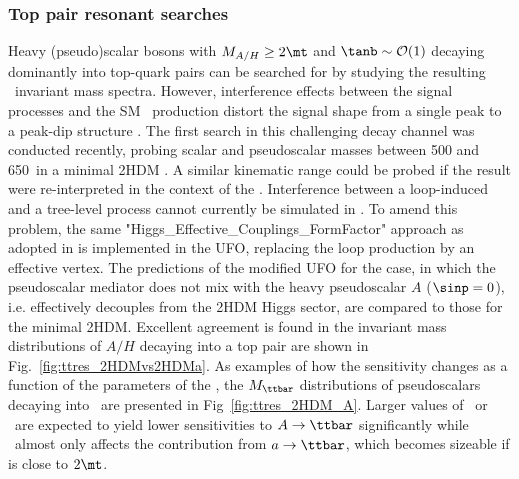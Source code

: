 \subsubsection{Top pair resonant searches}
Heavy (pseudo)scalar bosons with $M_{A/H}\ge2\mt$ and $\tanb \sim \mathcal{O}(1)$ decaying dominantly into top-quark pairs can be
searched for by studying the resulting \ttbar\ invariant mass
spectra. However, interference effects between the signal processes
and the SM \ttbar\ production distort the signal shape from a single
peak to a peak-dip structure \cite{Carena:2016npr}. The first search in this challenging decay channel was conducted recently, probing scalar and pseudoscalar masses between 500 and 650\GeV\ in a minimal 2HDM \cite{Aaboud:2017hnm}. A similar kinematic range could be probed if the result were re-interpreted in the context of the \hdma. Interference between
a loop-induced and a tree-level process cannot currently be simulated in \mg. To amend this problem, the same "Higgs\_Effective\_Couplings\_FormFactor"
approach \cite{ttinterfHFF} as adopted in \cite{Aaboud:2017hnm} is implemented in the UFO, replacing the loop production by an 
effective vertex. The predictions of the modified UFO for the case, in which the pseudoscalar mediator does not mix with the heavy pseudoscalar $A$ ($\sinp=0$), i.e. effectively decouples from the 2HDM Higgs sector, are compared to those for the minimal 2HDM. Excellent agreement is found in the invariant mass distributions of $A/H$ decaying into a top pair are shown in Fig.~\ref{fig:ttres_2HDMvs2HDMa}. As examples of how the sensitivity changes as a function of the parameters of the \hdma, the $M_{\ttbar}$ distributions of pseudoscalars decaying into \ttbar\ are presented in Fig~\ref{fig:ttres_2HDM_A}. Larger values of \tanb\ or \sinp\ are expected to yield lower sensitivities to $A\rightarrow\ttbar$ significantly while \ma\ almost only affects the contribution from $a\rightarrow\ttbar$, which becomes sizeable if \ma is close to $2\mt$.
